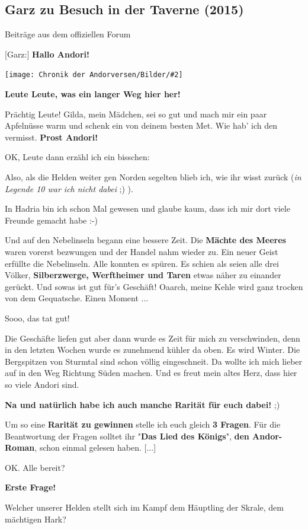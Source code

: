 \documentclass[10pt, a4paper, oneside]{book}
\newcommand{\fillbreak}{\vspace*{\fill}\columnbreak}
\newcommand{\storytext}[1]{%
    \section{#1}%
    \label{Storytext: #1}%
}
\newcommand{\bildmitts}[2][height=0.32\textwidth,width=0.48\textwidth,keepaspectratio]{%
    \begin{center}
        \texttt{[image: Chronik der Andorversen/Bilder/\#2]}
    \end{center}
}
\begin{document}
\begin{multicols}{2}
\fillbreak
\storytext{Garz zu Besuch in der Taverne (2015)}

\begin{center}
    Beiträge aus dem offiziellen Forum
\end{center}

[Garz:] \textbf{Hallo Andori!}

\bildmitts{Garz zu Besuch in der Taverne 1.jpeg}

\textbf{Leute Leute, was ein langer Weg hier her!}


Prächtig Leute! Gilda, mein Mädchen, sei so gut und mach mir ein paar Apfelnüsse warm und schenk ein von deinem besten Met. Wie hab' ich den vermisst. \textbf{Prost Andori!}

OK, Leute dann erzähl ich ein bisschen:

Also, als die Helden weiter gen Norden segelten blieb ich, wie ihr wisst zurück (\textit{in Legende 10 war ich nicht dabei} ;) ).

In Hadria bin ich schon Mal gewesen und glaube kaum, dass ich mir dort viele Freunde gemacht habe :-)

Und auf den Nebelinseln begann eine bessere Zeit. Die\textbf{ Mächte des Meeres} waren vorerst bezwungen und der Handel nahm wieder zu. Ein neuer Geist erfüllte die Nebelinseln. Alle konnten es spüren. Es schien als seien alle drei Völker, \textbf{Silberzwerge, Werftheimer und Taren} etwas näher zu einander gerückt. Und sowas ist gut für's Geschäft! Oaarch, meine Kehle wird ganz trocken von dem Gequatsche. Einen Moment ...

Sooo, das tat gut!

Die Geschäfte liefen gut aber dann wurde es Zeit für mich zu verschwinden, denn in den letzten Wochen wurde es zunehmend kühler da oben. Es wird Winter. Die Bergspitzen von Sturmtal sind schon völlig eingeschneit. Da wollte ich mich lieber auf in den Weg Richtung Süden machen. Und es freut mein altes Herz, dass hier so viele Andori sind.

\textbf{Na und natürlich habe ich auch manche Rarität für euch dabei!} ;)

Um so eine \textbf{Rarität zu gewinnen} stelle ich euch gleich \textbf{3 Fragen}. Für die Beantwortung der Fragen solltet ihr "\textbf{Das Lied des Königs}", \textbf{den Andor-Roman}, schon einmal gelesen haben. [...]

OK. Alle bereit?

\textbf{Erste Frage!}

Welcher unserer Helden stellt sich im Kampf dem Häuptling der Skrale, dem mächtigen Hark?


\end{multicols}
\end{document}

